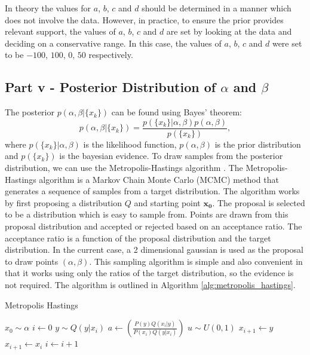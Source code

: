 \documentclass[11pt]{article}
\begin{document}
In theory the values for $a$, $b$, $c$ and $d$ should be determined in a manner which does not involve the data. However, in practice, to ensure the prior provides relevant support, the values of $a$, $b$, $c$ and $d$ are set by looking at the data and deciding on a conservative range. In this case, the values of $a$, $b$, $c$ and $d$ were set to be $-100$, $100$, $0$, $50$ respectively.


\subsection{Part v - Posterior Distribution of $\alpha$ and $\beta$}

The posterior $p(\alpha, \beta | \{x_k\})$ can be found using Bayes' theorem:
\[
p(\alpha, \beta | \{x_k\}) = \frac{p(\{x_k\} | \alpha, \beta) p(\alpha, \beta)}{p(\{x_k\})},
\] where $p(\{x_k\} | \alpha, \beta)$ is the likelihood function, $p(\alpha, \beta)$ is the prior distribution and $p(\{x_k\})$ is the bayesian evidence. 
To draw samples from the posterior distribution, we can use the Metropolis-Hastings algorithm \cite{Robert2004}. The Metropolis-Hastings algorithm is a Markov Chain Monte Carlo (MCMC)
method that generates a sequence of samples from a target distribution. The algorithm works by first proposing a distribution $Q$ and starting point $\mathbf{x_0}$. The proposal is selected to be a distribution which is easy to sample from. Points are drawn from this proposal distribution and accepted or rejected based on an acceptance ratio. The acceptance ratio is a function of the proposal distribution and the target distribution. In the current case, a 2 dimensional gaussian is used as the proposal to draw points $(\alpha, \beta)$.
This sampling algorithm is simple and also convenient in that it works using only the ratios of the target distribution, so the evidence is not required. The algorithm is outlined in Algorithm \ref{alg:metropolis_hastings}.

\begin{algorithm}[H]
    \caption{Metropolis Hastings}
    \begin{algorithmic}[1]
    \State $x_0 \sim \alpha$
    \State $i \gets 0$
        \State $y \sim Q(y|x_i)$ 
        \State $a \gets \left(\frac{P(y)Q(x_i|y)}{P(x_i)Q(y|x_i)}\right)$ 
        \State $u \sim U(0,1)$
            \State $x_{i+1} \gets y$ 
        \Else
            \State $x_{i+1} \gets x_i$ 
        \EndIf
        \State $i \gets i + 1$
    \EndWhile
    \end{algorithmic}
    \label{alg:metropolis_hastings}
\end{algorithm}
    
\end{document}
